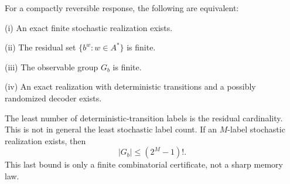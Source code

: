 \begin{theorem}\label{thm:r72-reversible}
For a compactly reversible response, the following are equivalent:

\textup{(i)} An exact finite stochastic realization exists.

\textup{(ii)} The residual set $\{b^w:w\in A^*\}$ is finite.

\textup{(iii)} The observable group $G_b$ is finite.

\textup{(iv)} An exact realization with deterministic transitions and a possibly randomized decoder exists.

The least number of deterministic-transition labels is the residual cardinality. This is not in general the least stochastic label count. If an $M$-label stochastic realization exists, then
\[
 |G_b|\le(2^M-1)!.
\]
This last bound is only a finite combinatorial certificate, not a sharp memory law.
\end{theorem}
